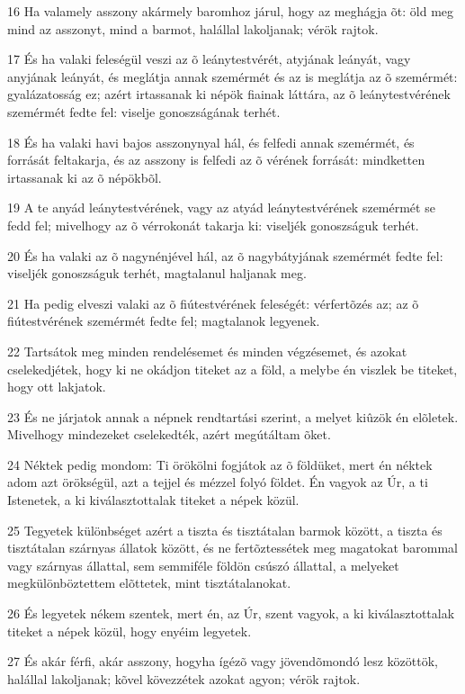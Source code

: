 \par 16 Ha valamely asszony akármely baromhoz járul, hogy az meghágja õt: öld meg mind az asszonyt, mind a barmot, halállal lakoljanak; vérök rajtok.
\par 17 És ha valaki feleségül veszi az õ leánytestvérét, atyjának leányát, vagy anyjának leányát, és meglátja annak szemérmét és az is meglátja az õ szemérmét: gyalázatosság ez; azért irtassanak ki népök fiainak láttára, az õ leánytestvérének szemérmét fedte fel: viselje gonoszságának terhét.
\par 18 És ha valaki havi bajos asszonynyal hál, és felfedi annak szemérmét, és forrását feltakarja, és az asszony is felfedi az õ vérének forrását: mindketten irtassanak ki az õ népökbõl.
\par 19 A te anyád leánytestvérének, vagy az atyád leánytestvérének szemérmét se fedd fel; mivelhogy az õ vérrokonát takarja ki: viseljék gonoszságuk terhét.
\par 20 És ha valaki az õ nagynénjével hál, az õ nagybátyjának szemérmét fedte fel: viseljék gonoszságuk terhét, magtalanul haljanak meg.
\par 21 Ha pedig elveszi valaki az õ fiútestvérének feleségét: vérfertõzés az; az õ fiútestvérének szemérmét fedte fel; magtalanok legyenek.
\par 22 Tartsátok meg minden rendelésemet és minden végzésemet, és azokat cselekedjétek, hogy ki ne okádjon titeket az a föld, a melybe én viszlek be titeket, hogy ott lakjatok.
\par 23 És ne járjatok annak a népnek rendtartási szerint, a melyet kiûzök én elõletek. Mivelhogy mindezeket cselekedték, azért megútáltam õket.
\par 24 Néktek pedig mondom: Ti örökölni fogjátok az õ földüket, mert én néktek adom azt örökségül, azt a tejjel és mézzel folyó földet. Én vagyok az Úr, a ti Istenetek, a ki kiválasztottalak titeket a népek közül.
\par 25 Tegyetek különbséget azért a tiszta és tisztátalan barmok között, a tiszta és tisztátalan szárnyas állatok között, és ne fertõztessétek meg magatokat barommal vagy szárnyas állattal, sem semmiféle földön csúszó állattal, a melyeket megkülönböztettem elõttetek, mint tisztátalanokat.
\par 26 És legyetek nékem szentek, mert én, az Úr, szent vagyok, a ki kiválasztottalak titeket a népek közül, hogy enyéim legyetek.
\par 27 És akár férfi, akár asszony, hogyha ígézõ vagy jövendõmondó lesz közöttök, halállal lakoljanak; kõvel kövezzétek azokat agyon; vérök rajtok.

